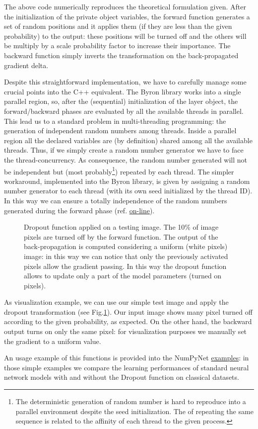 \documentclass{standalone}
\begin{document}
The above code numerically reproduces the theoretical formulation given.
After the initialization of the private object variables, the forward function generates a set of random positions and it applies them (if they are less than the given probability) to the output: these positions will be turned off and the others will be multiply by a scale probability factor to increase their importance.
The backward function simply inverts the transformation on the back-propagated gradient \textsf{delta}.

Despite this straightforward implementation, we have to carefully manage some crucial points into the \textsf{C++} equivalent.
The \textsf{Byron} library works into a single parallel region, so, after the (sequential) initialization of the layer object, the forward/backward phases are evaluated by all the available threads in parallel.
This lead us to a standard problem in multi-threading programming: the generation of independent random numbers among threads.
Inside a parallel region all the declared variables are (by definition) shared among all the available threads.
Thus, if we simply create a random number generator we have to face the thread-concurrency.
As consequence, the random number generated will not be independent but (most probably\footnote{
  The deterministic generation of random number is hard to reproduce into a parallel environment despite the seed initialization.
  The  of repeating the same sequence is related to the affinity of each thread to the given process.
}) repeated by each thread.
The simpler workaround, implemented into the \textsf{Byron} library, is given by assigning a random number generator to each thread (with its own seed initialized by the thread ID).
In this way we can ensure a totally independence of the random numbers generated during the forward phase (ref. \href{https://github.com/Nico-Curti/Byron/blob/master/src/dropout_layer.cpp}{on-line}).

\begin{figure}[htbp]
\centering
\def\svgwidth{0.8\textwidth}

\caption{Dropout function applied on a testing image.
The 10\% of image pixels are turned off by the forward function.
The output of the back-propagation is computed considering a uniform (white pixels) image: in this way we can notice that only the previously activated pixels allow the gradient passing.
In this way the dropout function allows to update only a part of the model parameters (turned on pixels).
}
\label{fig:dropout}
\end{figure}

As visualization example, we can use our simple test image and apply the dropout transformation (see Fig.\ref{fig:dropout}).
Our input image shows many pixel turned off according to the given probability, as expected.
On the other hand, the backward output turns on only the same pixel: for visualization purposes we manually set the gradient to a uniform value.

An usage example of this functions is provided into the \textsf{NumPyNet} \href{https://github.com/Nico-Curti/NumPyNet/tree/master/examples}{examples}: in those simple examples we compare the learning performances of standard neural network models with and without the Dropout function on classical datasets.
\end{document}
